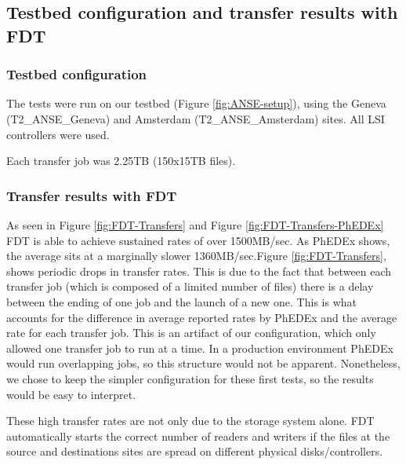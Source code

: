 \subsection{Testbed configuration and transfer results with FDT}

\subsubsection{Testbed configuration}

The tests were run on our testbed (Figure \ref{fig:ANSE-setup}), using the Geneva
(T2\_ANSE\_Geneva) and Amsterdam (T2\_ANSE\_Amsterdam) sites. All LSI controllers
were used.

Each transfer job was 2.25TB (150x15TB files).

\subsubsection{Transfer results with FDT}

As seen in Figure \ref{fig:FDT-Transfers} and Figure \ref{fig:FDT-Transfers-PhEDEx}
FDT is able to achieve sustained rates of over 1500MB/sec. As PhEDEx shows,
the average sits at a marginally slower 1360MB/sec.Figure \ref{fig:FDT-Transfers}, shows periodic drops in transfer rates.
This is due to the fact that between each transfer job (which is composed of a limited
number of files) there is a delay between the ending of one job and the launch of
a new one. This is what accounts for the difference in average reported rates by PhEDEx
and the average rate for each transfer job. This is an artifact of our configuration, which only allowed one
transfer job to run at a time. In a production environment PhEDEx would run overlapping jobs, so this structure would not be apparent. Nonetheless, we chose to keep the simpler configuration for these first tests, so the results would be easy to interpret.

These high transfer rates are not only due to the storage system alone. FDT
automatically starts the correct number of readers and writers if the files at 
the source and destinations sites are spread on different physical disks/controllers.

